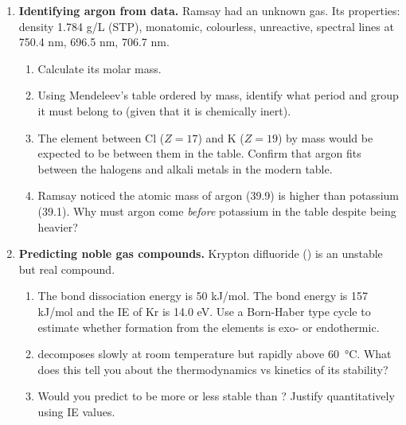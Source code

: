 \documentclass[12pt, a4paper]{book}
\begin{document}
\begin{problembox}
\begin{enumerate}[label=\textbf{\arabic*.}]
  \item \textbf{Identifying argon from data.}
        Ramsay had an unknown gas.
        Its properties: density 1.784 g/L (STP),
        monatomic, colourless, unreactive,
        spectral lines at 750.4 nm, 696.5 nm, 706.7 nm.
        \begin{enumerate}[label=(\alph*)]
          \item Calculate its molar mass.
          \item Using Mendeleev's table ordered by mass,
                identify what period and group it must
                belong to (given that it is chemically inert).
          \item The element between Cl ($Z=17$) and K ($Z=19$)
                by mass would be expected to be between
                them in the table.
                Confirm that argon fits between the halogens
                and alkali metals in the modern table.
          \item Ramsay noticed the atomic mass of argon (39.9)
                is higher than potassium (39.1).
                Why must argon come \emph{before} potassium
                in the table despite being heavier?
        \end{enumerate}

  \item \textbf{Predicting noble gas compounds.}
        Krypton difluoride () is an unstable
        but real compound.
        \begin{enumerate}[label=(\alph*)]
          \item The  bond dissociation energy
                is 50 kJ/mol.
                The  bond energy is 157 kJ/mol
                and the IE of Kr is 14.0 eV.
                Use a Born-Haber type cycle to estimate
                whether  formation from the elements
                is exo- or endothermic.
          \item {} decomposes slowly at room temperature
                but rapidly above \SI{60}{\degreeCelsius}.
                What does this tell you about the
                thermodynamics vs kinetics of its stability?
          \item Would you predict  to be more
                or less stable than ?
                Justify quantitatively using IE values.
        \end{enumerate}


\end{enumerate}
\end{problembox}
\end{document}
